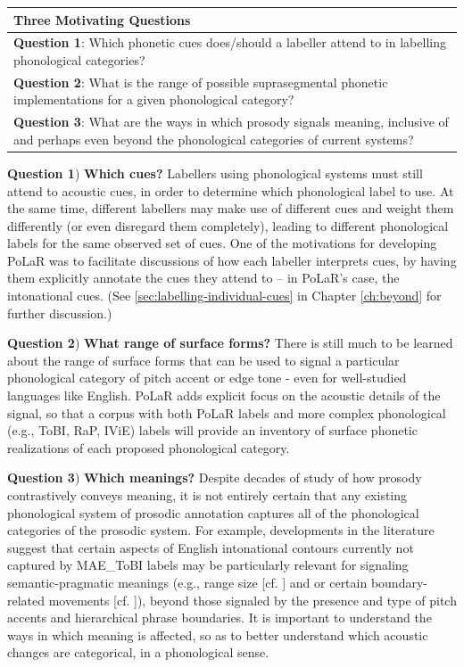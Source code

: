 \documentclass[11pt, twoside]{memoir}
\def\arraystretch{1.15}
\begin{document}
\begin{center}
\renewcommand{\arraystretch}{1.5}
\begin{tabular}{>{\raggedright\arraybackslash}p{.85\linewidth}}
\textbf{Three Motivating Questions}\\
\hline
\textbf{Question 1}: Which phonetic cues does\slash should a labeller attend to in labelling phonological categories?\\
\textbf{Question 2}: What is the range of possible suprasegmental phonetic implementations for a given phonological category?\\
\textbf{Question 3}: What are the ways in which prosody signals meaning, inclusive of and perhaps even beyond the phonological categories of current systems?\\
\end{tabular}
\end{center}


\textbf{Question 1}) \textbf{Which cues?} Labellers using phonological systems must still attend to acoustic cues, in order to determine which phonological label to use. At the same time, different labellers may make use of different cues and weight them differently (or even disregard them completely), leading to different phonological labels for the same observed set of cues. One of the motivations for developing PoLaR was to facilitate discussions of how each labeller interprets cues, by having them explicitly annotate the cues they attend to -- in PoLaR’s case, the intonational cues.  (See \ref{sec:labelling-individual-cues} in Chapter \ref{ch:beyond} for further discussion.)

\textbf{Question 2}) \textbf{What range of surface forms?} There is still much to be learned about the range of surface forms that can be used to signal a particular phonological category of pitch accent or edge tone - even for well-studied languages like English. PoLaR adds explicit focus on the acoustic details of the signal, so that a corpus with both PoLaR labels and more complex phonological (e.g., ToBI, RaP, IViE) labels will provide an inventory of surface phonetic realizations of each proposed phonological category.

\textbf{Question 3}) \textbf{Which meanings?} Despite decades of study of how prosody contrastively conveys meaning, it is not entirely certain that any existing phonological system of prosodic annotation captures all of the phonological categories of the prosodic system. For example, developments in the literature suggest that certain aspects of English intonational contours currently not captured by MAE\_ToBI labels may be particularly relevant for signaling semantic-pragmatic meanings (e.g., range size [cf. \citealt{ladd94}] and or certain boundary-related movements [cf. \citealt{ahn-16}]), beyond those signaled by the presence and type of pitch accents and hierarchical phrase boundaries. It is important to understand the ways in which meaning is affected, so as to better understand which acoustic changes are categorical, in a phonological sense.
\end{document}

